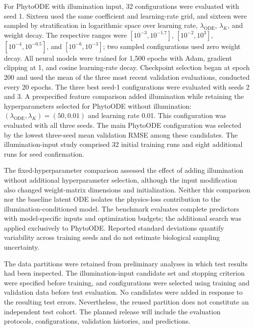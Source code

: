 For PhytoODE with illumination input, 32 configurations were evaluated with seed 1. Sixteen used the same coefficient and learning-rate grid, and sixteen were sampled by stratification in logarithmic space over learning rate, $\lambda_{\mathrm{ODE}}$, $\lambda_K$, and weight decay. The respective ranges were $[10^{-3},10^{-1.7}]$, $[10^{-2},10^3]$, $[10^{-4},10^{-0.5}]$, and $[10^{-6},10^{-3}]$; two sampled configurations used zero weight decay. All neural models were trained for 1,500 epochs with Adam, gradient clipping at 1, and cosine learning-rate decay. Checkpoint selection began at epoch 200 and used the mean of the three most recent validation evaluations, conducted every 20 epochs. The three best seed-1 configurations were evaluated with seeds 2 and 3. A prespecified feature comparison added illumination while retaining the hyperparameters selected for PhytoODE without illumination: $(\lambda_{\mathrm{ODE}},\lambda_K)=(50,0.01)$ and learning rate 0.01. This configuration was evaluated with all three seeds. The main PhytoODE configuration was selected by the lowest three-seed mean validation RMSE among these candidates. The illumination-input study comprised 32 initial training runs and eight additional runs for seed confirmation.

The fixed-hyperparameter comparison assessed the effect of adding illumination without additional hyperparameter selection, although the input modification also changed weight-matrix dimensions and initialization. Neither this comparison nor the baseline latent ODE isolates the physics-loss contribution to the illumination-conditioned model. The benchmark evaluates complete predictors with model-specific inputs and optimization budgets; the additional search was applied exclusively to PhytoODE. Reported standard deviations quantify variability across training seeds and do not estimate biological sampling uncertainty.

The data partitions were retained from preliminary analyses in which test results had been inspected. The illumination-input candidate set and stopping criterion were specified before training, and configurations were selected using training and validation data before test evaluation. No candidates were added in response to the resulting test errors. Nevertheless, the reused partition does not constitute an independent test cohort. The planned release will include the evaluation protocols, configurations, validation histories, and predictions.
